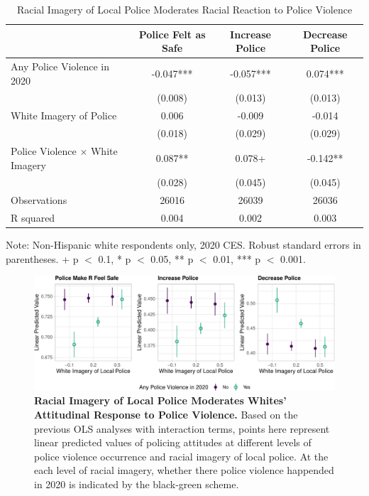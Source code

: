 \documentclass[
  12pt,
]{article}
\begin{document}
\hypertarget{tbl-reaction}{}
\begin{table}
\caption{\label{tbl-reaction}Racial Imagery of Local Police Moderates Racial Reaction to Police
Violence }\tabularnewline

\centering
\begin{threeparttable}
\begin{tabular}[t]{lccc}
\toprule
  & Police Felt as Safe & Increase Police & Decrease Police\\
\midrule
Any Police Violence in 2020 & -0.047*** & -0.057*** & 0.074***\\
 & (0.008) & (0.013) & (0.013)\\
White Imagery of Police & 0.006 & -0.009 & -0.014\\
 & (0.018) & (0.029) & (0.029)\\
Police Violence × White Imagery & 0.087** & 0.078+ & -0.142**\\
 & (0.028) & (0.045) & (0.045)\\
\midrule
Observations & 26016 & 26039 & 26036\\
R squared & 0.004 & 0.002 & 0.003\\
\bottomrule
\end{tabular}
\begin{tablenotes}
\item Note: Non-Hispanic white respondents only, 2020 CES. Robust standard errors in parentheses. + p $<$ 0.1, * p $<$ 0.05, ** p $<$ 0.01, *** p $<$ 0.001.
\end{tablenotes}
\end{threeparttable}
\end{table}

\begin{figure}[tb]

{\centering \includegraphics{racialized-police_files/figure-pdf/fig-reaction-mod-1.pdf}

}

\caption{\label{fig-reaction-mod}\textbf{Racial Imagery of Local Police
Moderates Whites' Attitudinal Response to Police Violence.} Based on the
previous OLS analyses with interaction terms, points here represent
linear predicted values of policing attitudes at different levels of
police violence occurrence and racial imagery of local police. At the
each level of racial imagery, whether there police violence happended in
2020 is indicated by the black-green scheme.}

\end{figure}
\end{document}
